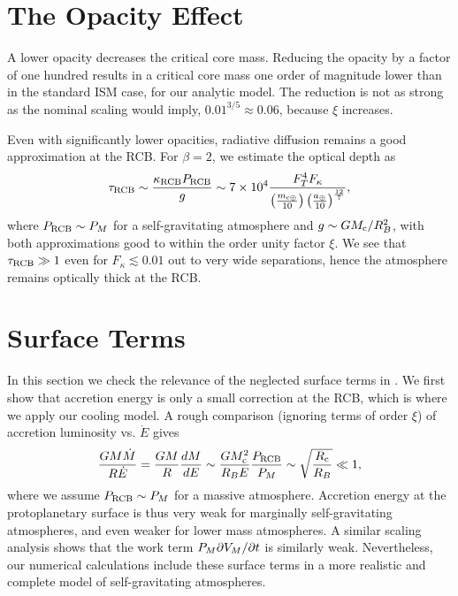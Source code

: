 \section{The Opacity Effect}
\label{opacityan}
A  lower opacity  decreases the critical core mass.  Reducing the opacity by a factor of one hundred results in a critical core mass one order of magnitude lower than in the standard ISM case, for our analytic model. The reduction is not  as strong as the nominal scaling would imply, $0.01^{3/5} \approx 0.06$, because $\xi$ increases.

Even with significantly lower opacities, radiative diffusion remains a good approximation at the RCB. For $\beta = 2$, we estimate the optical depth as
\begin{equation}
\tau_{\rm RCB} \sim {\kappa_{\rm RCB}P_{\rm RCB}\over g} \sim 7 \times 10^4 {F_T^4 F_\kappa \over \left(m_{\rm c \oplus} \over 10 \right) \left(a_\oplus \over 10\right)^{12 \over 7}}, 
\end{equation} 
where $P_{\rm RCB} \sim P_M$ for a self-gravitating atmosphere and $g \sim G M_{\rm c}/R_B^2$, with both approximations good to within the order unity factor $\xi$.  We see that $\tau_{\rm RCB} \gg 1$ even for $F_\kappa \lesssim 0.01$ out to very wide separations, hence the atmosphere remains optically thick at the RCB.


\section{Surface Terms}
\label{surfterms}
In this section we check the relevance of the neglected surface terms in .  We first show that accretion energy is only a small correction at the RCB, which is where we apply our cooling model. A rough comparison (ignoring terms of order $\xi$) of  accretion luminosity vs. $\dot{E}$ gives
\begin{equation}
{G M \dot{M} \over R \dot{E}} = {G M  \over R}{dM \over dE} \sim {G M_{\rm c}^2 \over R_B E}{P_{\rm RCB}\over P_M} \sim \sqrt{R_{\rm c} \over R_B} \ll 1,
\end{equation} 
where we assume $P_{\rm RCB} \sim P_M$  for a massive atmosphere.  Accretion energy at the protoplanetary surface is thus very weak for marginally self-gravitating atmospheres, and even weaker for lower mass atmospheres.  A similar scaling analysis shows that the work term $P_M \partial V_M/\partial t$ is similarly weak.  Nevertheless, our numerical calculations include these surface terms in a more realistic and complete model of self-gravitating atmospheres.


